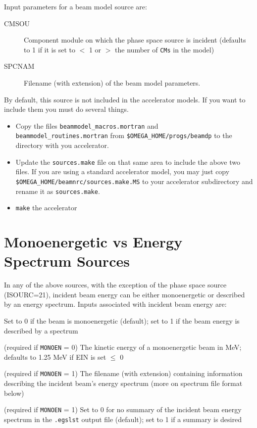\documentclass[12pt,twoside]{article}
\begin{document}
Input parameters for a beam model source are:

\begin{description}
\item [CMSOU] Component module on which the phase space source is
incident (defaults to 1 if it is set to $<$ 1 or $>$ the number of
\verb+CMs+
in the model)
\item [SPCNAM] Filename (with extension) of the beam model parameters.
\end{description}

By default, this source is not included in the accelerator models. If you
want to include them you must do several things.
\begin{itemize}
\item Copy the files {\tt beammodel\_macros.mortran} and {\tt
beammodel\_routines.mortran} from {\tt \$OMEGA\_HOME/progs/beamdp} to the
directory with you accelerator.

\item Update the {\tt sources.make} file on that same area to include the
above two files.  If you are using a standard accelerator model, you may
just copy {\tt \$OMEGA\_HOME/beamnrc/sources.make.MS} to your accelerator
subdirectory and rename it as {\tt sources.make}.

\item {\tt make} the accelerator
\end{itemize}



\newpage
\section{Monoenergetic vs Energy Spectrum Sources}
  

In any of the above sources, with the exception of the phase space source
(ISOURC=21), incident beam energy can be either monoenergetic or described by an energy
spectrum.  Inputs associated with incident beam energy are:

\begin{description}

\item [MONOEN] Set to 0 if the beam is monoenergetic (default); set to 1
if the beam energy is described by a spectrum
\item [EIN] (required if \verb+MONOEN+ = 0) The kinetic energy of a monoenergetic beam in MeV; defaults
to 1.25 MeV if EIN is set $\leq$ 0
\item [FILNAM] (required if \verb+MONOEN+ = 1) The filename (with extension)
containing information describing the incident beam's energy spectrum
(more on spectrum file format below)
\item [IOUTSP] (required if \verb+MONOEN+ = 1) Set to 0 for no summary of the
incident beam energy spectrum in the \verb+.egslst+ output file
(default); set to 1 if a summary is desired
\end{description}
\end{document}
